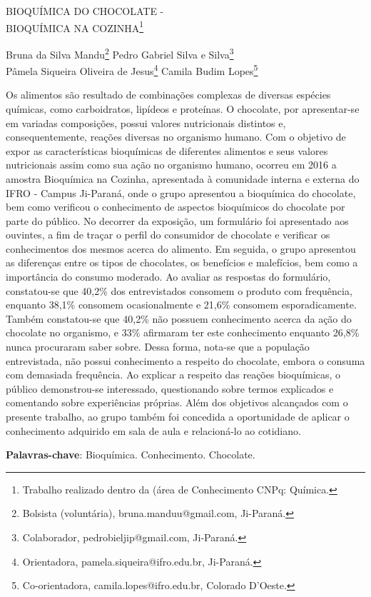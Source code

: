 \documentclass[article,12pt,onesidea,4paper,english,brazil]{abntex2}
\begin{document}
	
	
	\frenchspacing 
	
	\begin{center}
		\LARGE BIOQUÍMICA DO CHOCOLATE -\\ BIOQUÍMICA NA COZINHA\footnote{Trabalho realizado dentro da (área de Conhecimento CNPq: Química.}
		
		\normalsize
		Bruna da Silva Mandu\footnote{Bolsista (voluntária), bruna.manduu@gmail.com, Ji-Paraná.} 
		Pedro Gabriel Silva e Silva\footnote{Colaborador, pedrobieljip@gmail.com, Ji-Paraná.} \\
		Pâmela Siqueira Oliveira de Jesus\footnote{Orientadora, pamela.siqueira@ifro.edu.br, Ji-Paraná.} 
		Camila Budim Lopes\footnote{Co-orientadora, camila.lopes@ifro.edu.br, Colorado D’Oeste.} 
	\end{center}
	
	\noindent Os alimentos são resultado de combinações complexas de diversas espécies químicas, como carboidratos, lipídeos e proteínas. O chocolate, por apresentar-se em variadas composições, possui valores nutricionais distintos e, consequentemente, reações diversas no organismo humano. Com o objetivo de expor as características bioquímicas de diferentes alimentos e seus valores nutricionais assim como sua ação no organismo humano, ocorreu em 2016 a amostra Bioquímica na Cozinha, apresentada à comunidade interna e externa do IFRO - Campus Ji-Paraná, onde o grupo apresentou a bioquímica do chocolate, bem como verificou o conhecimento de aspectos bioquímicos do chocolate por parte do público. No decorrer da exposição, um formulário foi apresentado aos ouvintes, a fim de traçar o perfil do consumidor de chocolate e verificar os conhecimentos dos mesmos acerca do alimento. Em seguida, o grupo apresentou as diferenças entre os tipos de chocolates, os benefícios e malefícios, bem como a importância do consumo moderado. Ao avaliar as respostas do formulário, constatou-se que 40,2\% dos entrevistados consomem o produto com frequência, enquanto 38,1\% consomem ocasionalmente e 21,6\% consomem esporadicamente. Também constatou-se que 40,2\% não possuem conhecimento acerca da ação do chocolate no organismo, e 33\% afirmaram ter este conhecimento enquanto 26,8\% nunca procuraram saber sobre. Dessa forma, nota-se que a população entrevistada, não possui conhecimento a respeito do chocolate, embora o consuma com demasiada frequência. Ao explicar a respeito das reações bioquímicas, o público demonstrou-se interessado, questionando sobre termos explicados e comentando sobre experiências próprias. Além dos objetivos alcançados com o presente trabalho, ao grupo também foi concedida a oportunidade de aplicar o conhecimento adquirido em sala de aula e relacioná-lo ao cotidiano.
	
	\vspace{\onelineskip}
	
	\noindent
	\textbf{Palavras-chave}: Bioquímica. Conhecimento. Chocolate.
	
\end{document}
